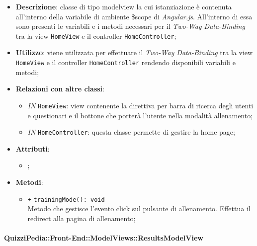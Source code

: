 	\begin{itemize}
		\item \textbf{Descrizione}: classe di tipo modelview la cui istanziazione è contenuta all'interno della variabile di ambiente \$scope di \textit{Angular.js}. All'interno di essa sono presenti le variabili e i metodi necessari per il \textit{Two-Way Data-Binding} tra la view \texttt{HomeView} e il controller \texttt{HomeController};
		\item \textbf{Utilizzo}: viene utilizzata per effettuare il \textit{Two-Way Data-Binding} tra la view \texttt{HomeView} e il controller \texttt{HomeController} rendendo disponibili variabili e metodi;
		\item \textbf{Relazioni con altre classi}: 
		\begin{itemize}
			\item \textit{IN} \texttt{HomeView}: view contenente la direttiva per barra di ricerca degli utenti e questionari e il bottone che porterà l’utente nella modalità allenamento; 
			\item \textit{IN} \texttt{HomeController}: questa classe permette di gestire la home page;
		\end{itemize}
		\item \textbf{Attributi}: 
		\begin{itemize}
			\item ;
		\end{itemize}
		\item \textbf{Metodi}: 
		\begin{itemize}
			\item \texttt{+} \texttt{trainingMode(): void} \\
			Metodo che gestisce l’evento click sul pulsante di allenamento. Effettua il redirect alla pagina di allenamento;
		\end{itemize}
	\end{itemize}
	
	\paragraph{QuizziPedia::Front-End::ModelViews::ResultsModelView}
	
	\label{QuizziPedia::Front-End::ModelViews::ResultsModelView}
	
